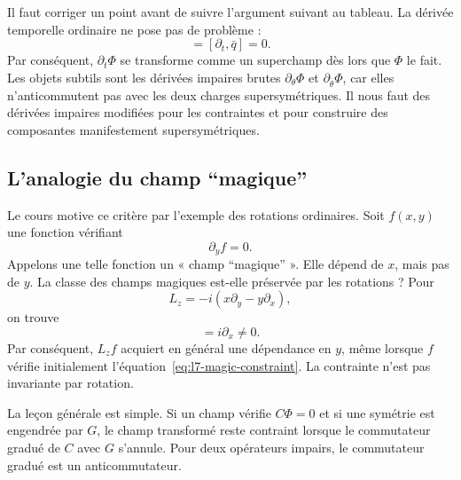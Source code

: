 Il faut corriger un point avant de suivre l’argument suivant au tableau. La dérivée temporelle ordinaire ne pose pas de problème :
\begin{equation}
[\partial_t,q]=[\partial_t,\bar q]=0.
\end{equation}
Par conséquent, \(\partial_t\Phi\) se transforme comme un superchamp dès lors que \(\Phi\) le fait. Les objets subtils sont les dérivées impaires brutes \(\partial_\theta\Phi\) et \(\partial_{\bar\theta}\Phi\), car elles n’anticommutent pas avec les deux charges supersymétriques. Il nous faut des dérivées impaires modifiées pour les contraintes et pour construire des composantes manifestement supersymétriques.

\subsection{L’analogie du champ ``magique''}

Le cours motive ce critère par l’exemple des rotations ordinaires. Soit \(f(x,y)\) une fonction vérifiant
\begin{equation}
\partial_y f=0.
\label{eq:l7-magic-constraint}
\end{equation}
Appelons une telle fonction un « champ ``magique'' ». Elle dépend de \(x\), mais pas de \(y\). La classe des champs magiques est-elle préservée par les rotations ? Pour
\begin{equation}
L_z=-i\left(x\partial_y-y\partial_x\right),
\end{equation}
on trouve
\begin{equation}
[\partial_y,L_z]=i\partial_x\neq0.
\end{equation}
Par conséquent, \(L_z f\) acquiert en général une dépendance en \(y\), même lorsque \(f\) vérifie initialement l’équation~\eqref{eq:l7-magic-constraint}. La contrainte n’est pas invariante par rotation.

La leçon générale est simple. Si un champ vérifie \(C\Phi=0\) et si une symétrie est engendrée par \(G\), le champ transformé reste contraint lorsque le commutateur gradué de \(C\) avec \(G\) s’annule. Pour deux opérateurs impairs, le commutateur gradué est un anticommutateur.

